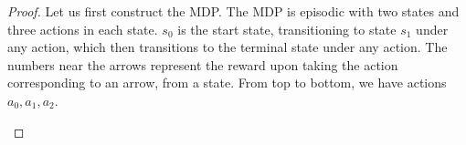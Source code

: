 \documentclass[twoside,11pt]{article}
\begin{document}
\begin{proof}
Let us first construct the MDP. The MDP is episodic with two states and three actions in each state. $s_0$ is the start state, transitioning to state $s_1$ under any action, which then transitions to the terminal state under any action. The numbers near the arrows represent the reward upon taking the action corresponding to an arrow, from a state. From top to bottom, we have actions $a_0, a_1, a_2$. 

\begin{center}
\end{center}
%


\end{proof}
\end{document}
